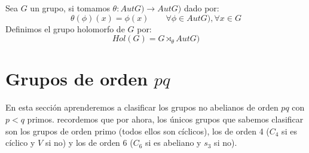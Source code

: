 \begin{definicion}
    Sea $G$ un grupo, si tomamos $\theta:AutG)\to AutG)$ dado por:
    \begin{equation*}
        \theta(\phi)(x) = \phi(x) \qquad \forall \phi \in AutG), \forall x\in G
    \end{equation*}
    Definimos el grupo holomorfo de $G$ por:
    \begin{equation*}
        Hol(G) = G\rtimes_\theta AutG)
    \end{equation*}
\end{definicion}

\section{Grupos de orden $pq$}
\noindent
En esta sección aprenderemos a clasificar los grupos no abelianos de orden $pq$ con $p<q$ primos. recordemos que por ahora, los únicos grupos que sabemos clasificar son los grupos de orden primo (todos ellos son cíclicos), los de orden 4 ($C_4$ si es cíclico y $V$ si no) y los de orden 6 ($C_6$ si es abeliano y $s_3$ si no).\\

